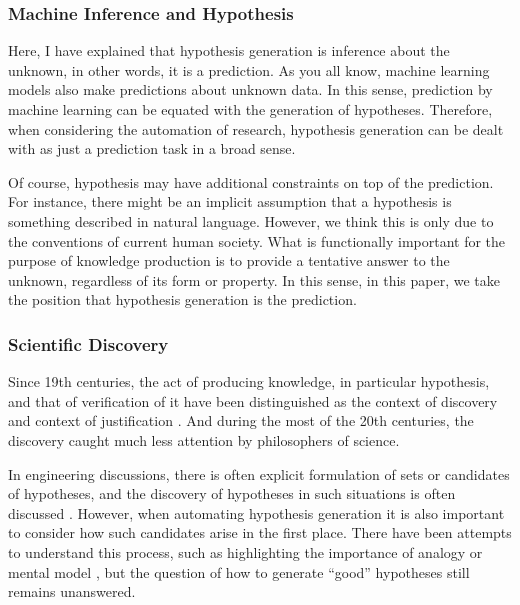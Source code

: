 \documentclass{book}
\begin{document}
\subsubsection{Machine Inference and Hypothesis}


Here, I have explained that hypothesis generation is inference about the unknown, in other words, it is a prediction. As you all know, machine learning models also make predictions about unknown data. In this sense, prediction by machine learning can be equated with the generation of hypotheses. Therefore, when considering the automation of research, hypothesis generation can be dealt with as just a prediction task in a broad sense.

Of course, hypothesis may have additional constraints on top of the prediction. For instance, there might be an implicit assumption that a hypothesis is something described in natural language. However, we think this is only due to the conventions of current human society. What is functionally important for the purpose of knowledge production is to provide a tentative answer to the unknown, regardless of its form or property. In this sense, in this paper, we take the position that hypothesis generation is the prediction.

\subsubsection{Scientific Discovery}


Since 19th centuries, the act of producing knowledge, in particular hypothesis, and that of verification of it have been distinguished as the context of discovery and context of justification \cite{sep-scientific-discovery}. And during the most of the 20th centuries, the discovery caught much less attention by philosophers of science. 

In engineering discussions, there is often explicit formulation of sets or candidates of hypotheses, and the discovery of hypotheses in such situations is often discussed \cite{simon1973does,kitano2021nobel,bengio2022ml4sci}. However, when automating hypothesis generation it is also important to consider how such candidates arise in the first place. There have been attempts to understand this process, such as highlighting the importance of analogy \cite{thagard1984conceptual} or mental model \cite{nersessian1999model}, but the question of how to generate ``good'' hypotheses still remains unanswered.
\end{document}
